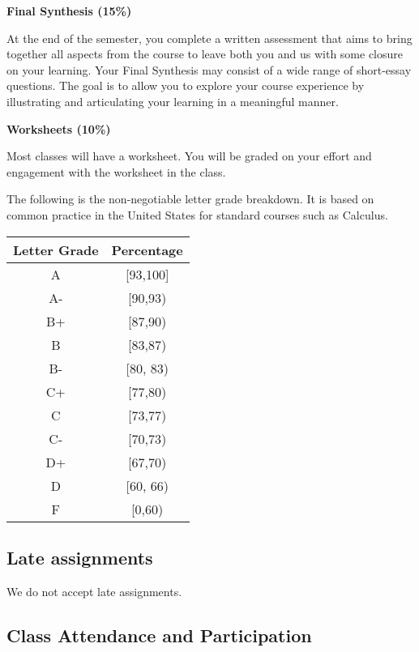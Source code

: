 \documentclass[
]{article}
\begin{document}
\textbf{Final Synthesis (15\%)}

At the end of the semester, you complete a written assessment that aims to bring together all aspects from the course to leave both you and us with some closure on your learning. Your Final Synthesis may consist of a wide range of short-essay questions. The goal is to allow you to explore your course experience by illustrating and articulating your learning in a meaningful manner.

\textbf{Worksheets (10\%)}

Most classes will have a worksheet. You will be graded on your effort and engagement with the worksheet in the class.

The following is the non-negotiable letter grade breakdown. It is based on
common practice in the United States for standard courses such as Calculus.

\begin{longtable}[]{@{}cc@{}}
\toprule\noalign{}
\textbf{Letter Grade} & \textbf{Percentage} \\
\midrule\noalign{}
\endhead
\bottomrule\noalign{}
\endlastfoot
A & {[}93,100{]} \\
A- & {[}90,93) \\
B+ & {[}87,90) \\
B & {[}83,87) \\
B- & {[}80, 83) \\
C+ & {[}77,80) \\
C & {[}73,77) \\
C- & {[}70,73) \\
D+ & {[}67,70) \\
D & {[}60, 66) \\
F & {[}0,60) \\
\end{longtable}

\hypertarget{late-assignments}{%
\subsection*{Late assignments}\label{late-assignments}}

We do not accept late assignments.

\hypertarget{class-attendance-and-participation}{%
\subsection*{Class Attendance and Participation}\label{class-attendance-and-participation}}
\end{document}

